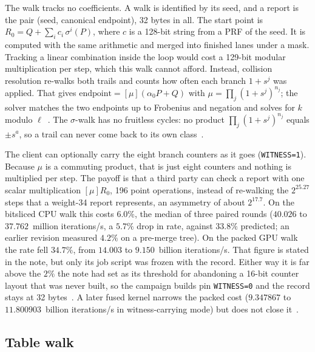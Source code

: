 The walk tracks no coefficients. A walk is identified by its seed, and
a report is the pair (seed, canonical endpoint), 32 bytes in all. The
start point is $R_0 = Q + \sum_i c_i\,\sigma^i(P)$, where $c$ is a
128-bit string from a PRF of the seed. It is computed with the same
arithmetic and merged into finished lanes under a mask. Tracking a
linear combination inside the loop would cost a 129-bit modular
multiplication per step, which this walk cannot afford. Instead,
collision resolution re-walks both trails and counts how often each
branch $1+s^j$ was applied. That gives
$\text{endpoint} = [\mu](\alpha_0 P + Q)$ with $\mu=\prod_j(1+s^j)^{n_j}$;
the solver matches the two endpoints up to Frobenius and negation and
solves for $k$ modulo $\ell$~.
The $\sigma$-walk has no fruitless cycles: no product
$\prod_j(1+s^j)^{n_j}$ equals $\pm s^a$, so a trail can never come back
to its own class~.

The client can optionally carry the eight branch counters as it goes
(\texttt{WITNESS=1}). Because $\mu$ is a commuting product, that is
just eight counters and nothing is multiplied per step. The payoff is
that a third party can check a report with one scalar multiplication
$[\mu]R_0$, 196 point operations, instead of re-walking the
$2^{25.27}$ steps that a weight-34 report represents, an asymmetry of
about $2^{17.7}$. On the bitsliced CPU walk this costs $6.0\%$, the
median of three paired rounds ($40.026$ to $37.762$~million iterations/s, a $5.7\%$
drop in rate, against $33.8\%$ predicted; an earlier revision measured
$4.2\%$ on a pre-merge tree). On the packed GPU walk the rate fell
$34.7\%$, from $14.003$ to $9.150$~billion iterations/s. That figure is stated in the
note, but only its job script was frozen with the
record. Either way it is far above the
$2\%$ the note had set as its threshold for abandoning a 16-bit
counter layout that was never built, so the campaign builds pin
\texttt{WITNESS=0} and the record stays at 32
bytes~.
A later fused kernel narrows the packed cost ($9.347867$ to
$11.800903$~billion iterations/s in witness-carrying mode) but does not close
it~.

\subsection{Table walk}
\label{sec:walk-table}

